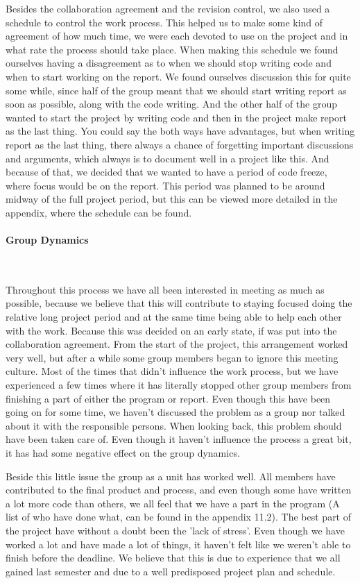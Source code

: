 \documentclass[a4paper,10pt,titlepage]{article}
\begin{document}
		Besides the collaboration agreement and the revision control, we also used a schedule to control the work process. This helped us to make some kind of agreement of how much time, we were each devoted to use on the project and in what rate the process should take place. When making this schedule we found ourselves having a disagreement as to when we should stop writing code and when to start working on the report. We found ourselves discussion this for quite some while, since half of the group meant that we should start writing report as soon as possible, along with the code writing. And the other half of the group wanted to start the project by writing code and then in the project make report as the last thing. You could say the both ways have advantages, but when writing report as the last thing, there always a chance of forgetting important discussions and arguments, which always is to document well in a project like this. And because of that, we decided that we wanted to have a period of code freeze, where focus would be on the report. This period was planned to be around midway of the full project period, but this can be viewed more detailed in the appendix, where the schedule can be found.
		
		\paragraph{Group Dynamics}\mbox{}\

		Throughout this process we have all been interested in meeting as much as possible, because we believe that this will contribute to staying focused doing the relative long project period and at the same time being able to help each other with the work. Because this was decided on an early state, if was put into the collaboration agreement. From the start of the project, this arrangement worked very well, but after a while some group members began to ignore this meeting culture. Most of the times that didn't influence the work process, but we have experienced a few times where it has literally stopped other group members from finishing a part of either the program or report. Even though this have been going on for some time, we haven't discussed the problem as a group nor talked about it with the responsible persons. When looking back, this problem should have been taken care of. Even though it haven't influence the process a great bit, it has had some negative effect on the group dynamics.

		Beside this little issue the group as a unit has worked well. All members have contributed to the final product and process, and even though some have written a lot more code than others, we all feel that we have a part in the program (A list of who have done what, can be found  in the appendix 11.2). The best part of the project have without a doubt been the 'lack of stress'. Even though we have worked a lot and have made a lot of things, it haven't felt like we weren't able to finish before the deadline. We believe that this is due to experience that we all gained last semester and due to a well predisposed project plan and schedule. 
\end{document}
